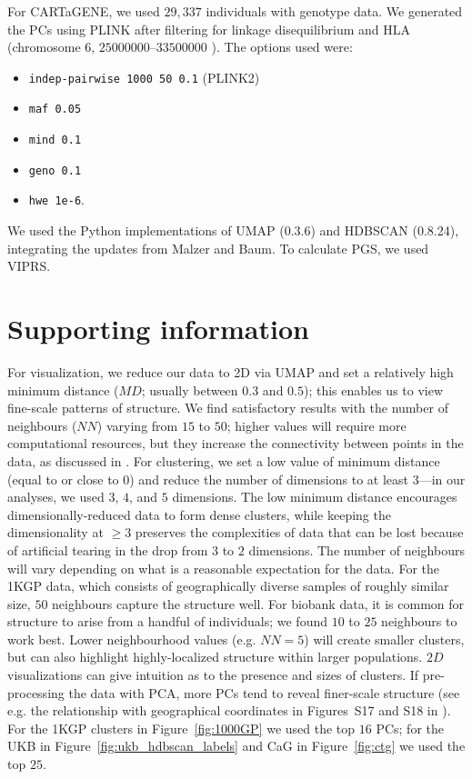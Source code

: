 For CARTaGENE, we used $29,337$ individuals with genotype data. We generated the PCs using PLINK\citep{purcell_plink_2007} after filtering for linkage disequilibrium and HLA (chromosome 6, $25000000\textbf{--}33500000$ ). The options used were:
\begin{itemize}
\item \verb|indep-pairwise 1000 50 0.1| (PLINK2)
\item \verb|maf 0.05|
\item \verb|mind 0.1|
\item \verb|geno 0.1|
\item \verb|hwe 1e-6|.
\end{itemize}

We used the Python implementations of UMAP\citep{mcinnes_umap_2020} (0.3.6) and HDBSCAN (0.8.24), integrating the updates from Malzer and Baum\citep{malzer_hybrid_2020}. To calculate PGS, we used VIPRS\citep{zabad_fast_2023}.

\section{Supporting information}

For visualization, we reduce our data to 2D via UMAP and set a relatively high minimum distance ($MD$; usually between $0.3$ and $0.5$); this enables us to view fine-scale patterns of structure. We find satisfactory results with the number of neighbours ($NN$) varying from $15$ to $50$; higher values will require more computational resources, but they increase the connectivity between points in the data, as discussed in \citep{diaz-papkovich_review_2021}. For clustering, we set a low value of minimum distance (equal to or close to $0$) and reduce the number of dimensions to at least $3$---in our analyses, we used $3$, $4$, and $5$ dimensions. The low minimum distance encourages dimensionally-reduced data to form dense clusters, while keeping the dimensionality at $\geq3$ preserves the complexities of data that can be lost because of artificial tearing in the drop from $3$ to $2$ dimensions. The number of neighbours will vary depending on what is a reasonable expectation for the data. For the 1KGP data, which consists of geographically diverse samples of roughly similar size, $50$ neighbours capture the structure well. For biobank data, it is common for structure to arise from a handful of individuals; we found $10$ to $25$ neighbours to work best. Lower neighbourhood values (e.g. $NN=5$) will create smaller clusters, but can also highlight highly-localized structure within larger populations. $2D$ visualizations can give intuition as to the presence and sizes of clusters. If pre-processing the data with PCA, more PCs tend to reveal finer-scale structure (see e.g. the relationship with geographical coordinates in Figures~S17 and S18 in \citep{diaz-papkovich_umap_2019}). For the 1KGP clusters in Figure~\ref{fig:1000GP} we used the top $16$ PCs; for the UKB in Figure~\ref{fig:ukb_hdbscan_labels} and CaG in Figure~\ref{fig:ctg} we used the top $25$.

